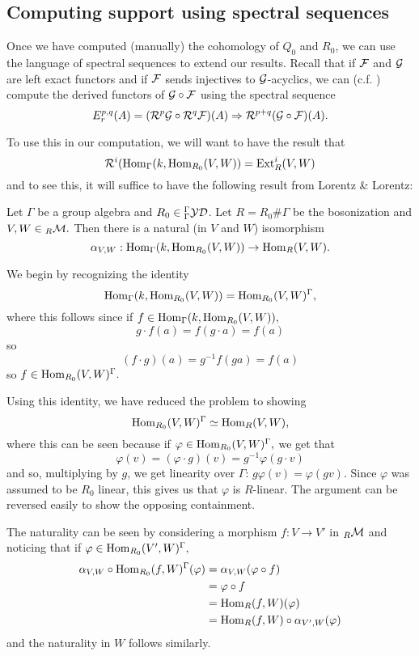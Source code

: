 \documentclass [11pt, proquest] {uwthesis}[2020/02/24]
\begin{document}
\subsection{Computing support using spectral sequences}
    Once we have computed (manually) the cohomology of $Q_0$ and $R_0$, we can use the language of spectral sequences to extend our results. Recall that if $\mathcal{F}$ and $\mathcal{G}$ are left exact functors and if $\mathcal{F}$ sends injectives to $\mathcal{G}$-acyclics, we can (c.f. \cite[\S 5.8]{weibel}) compute the derived functors of $\mathcal{G}\circ\mathcal{F}$ using the spectral sequence
    \[E_r^{p,q}(A)=(\mathcal{R}^p\mathcal{G}\circ \mathcal{R}^q\mathcal{F})(A)\Rightarrow \mathcal{R}^{p+q}(\mathcal{G}\circ\mathcal{F})(A).\]
    
    
    To use this in our computation, we will want to have the result that
    \[\mathcal{R}^i(\operatorname{Hom}_\Gamma(k,\operatorname{Hom}_{R_0}(V,W))=\operatorname{Ext}^i_R(V,W)\]
    and to see this, it will suffice to have the following result from Lorentz \& Lorentz:
    \begin{lem}\label{lem:natural-iso}
        Let $\Gamma$ be a group algebra and $R_0\in{^\Gamma_\Gamma\mathcal{YD}}$. Let $R=R_0\#\Gamma$ be the bosonization and $V,W\in{_R\mathcal{M}}.$ Then there is a natural (in $V$ and $W$) isomorphism
        \[\alpha_{V,W}:\operatorname{Hom}_\Gamma(k,\operatorname{Hom}_{R_0}(V,W))\to\operatorname{Hom}_R(V,W).\]
    \end{lem}
    \begin{prf}
        We begin by recognizing the identity
        \[\operatorname{Hom}_\Gamma(k,\operatorname{Hom}_{R_0}(V,W))=\operatorname{Hom}_{R_0}(V,W)^\Gamma,\]
        where this follows since if $f\in \operatorname{Hom}_\Gamma(k,\operatorname{Hom}_{R_0}(V,W)),$
        \[g\cdot f(a)=f(g\cdot a)=f(a)\]
        so 
        \[(f\cdot g)(a)=g^{-1}f(ga)=f(a)\]
        so $f\in\operatorname{Hom}_{R_0}(V,W)^\Gamma.$
        
        Using this identity, we have reduced the problem to showing
        \[\operatorname{Hom}_{R_0}(V,W)^\Gamma\simeq \operatorname{Hom}_R(V,W),\]
        where this can be seen because if $\varphi\in\operatorname{Hom}_{R_0}(V,W)^\Gamma,$ we get that 
        \[\varphi(v)=(\varphi\cdot g)(v)=g^{-1}\varphi(g\cdot v)\]
        and so, multiplying by $g$, we get linearity over $\Gamma$: $g\varphi(v)=\varphi(gv).$ Since $\varphi$ was assumed to be $R_0$ linear, this gives us that $\varphi$ is $R$-linear. The argument can be reversed easily to show the opposing containment.
        
        The naturality can be seen by considering a morphism $f:V\to V'$ in $_R\mathcal{M}$ and noticing that if $\varphi\in\operatorname{Hom}_{R_0}(V',W)^\Gamma,$
        \begin{align*}
            \alpha_{V,W}\circ\operatorname{Hom}_{R_0}(f,W)^\Gamma(\varphi)&=\alpha_{V,W}(\varphi\circ f)\\
            &=\varphi\circ f\\
            &=\operatorname{Hom}_R(f,W)(\varphi)\\
            &=\operatorname{Hom}_R(f,W)\circ\alpha_{V',W}(\varphi)
        \end{align*}
        and the naturality in $W$ follows similarly.
    \end{prf}
    
\end{document}
